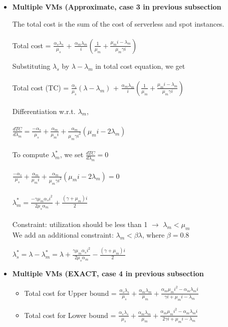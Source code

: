 \documentclass[letter,11pt]{article}
\begin{document}
\begin{itemize}
\item \textbf{Multiple VMs (Approximate, case 3 in previous subsection}

The total cost is the sum of the cost of serverless and spot instances. \\ \\
Total cost = $\frac{\alpha_s \lambda_s}{\mu_s}$ + $\frac{\alpha_m \lambda_m}{i} (\frac{1}{\mu_m} + \frac{\mu_m i - \lambda_m}{\mu_m \gamma i})$

Substituting $\lambda_s$ by $\lambda - \lambda_m$ in total cost equation, we get\\ \\
Total cost (TC) = $\frac{\alpha_s}{\mu_s}(\lambda - \lambda_m)$ + $\frac{\alpha_m \lambda_m}{i} (\frac{1}{\mu_m} + \frac{\mu_m i - \lambda_m}{\mu_m \gamma i})$ \\ \\
Differentiation w.r.t. $\lambda_m$, \\ \\
$\frac{d TC}{d \lambda_m} = \frac{- \alpha_s}{\mu_s} + \frac{\alpha_m}{\mu_m i} + \frac{\alpha_m}{\mu_m \gamma i^2}(\mu_m i - 2 \lambda_m)$ \\ \\
To compute $\lambda_m^{*}$, we set $\frac{d TC}{d \lambda_m} = 0$ \\ \\
$\frac{- \alpha_s}{\mu_s} + \frac{\alpha_m}{\mu_m i} + \frac{\alpha_m}{\mu_m \gamma i^2}(\mu_m i - 2 \lambda_m) = 0$ \\ \\ 
$\lambda_m^{*} = \frac{- \gamma \mu_m \alpha_s i^2}{2 \mu_s \alpha_m} + \frac{(\gamma + \mu_m)i}{2}$ \\ \\
Constraint: utilization should be less than 1 $\rightarrow$ $\lambda_m < \mu_m$\\  
We add an additional constraint: $\lambda_m < \beta \lambda$, where $\beta = 0.8$

$\lambda_s^{*} = \lambda - \lambda_m^{*} = \lambda + \frac{\gamma \mu_m \alpha_s i^2}{2 \mu_s \alpha_m} - \frac{(\gamma + \mu_m)i}{2}$

\item \textbf{Multiple VMs (EXACT, case 4 in previous subsection}

\begin{itemize}
\item Total cost for Upper bound = $\frac{\alpha_s \lambda_s}{\mu_s} + \frac{\alpha_m \lambda_m}{\mu_m} + \frac{\alpha_m \mu_m i^2 - \alpha_m \lambda_m i}{\gamma i + \mu_m i - \lambda_m}$
\item Total cost for Lower bound = $\frac{\alpha_s \lambda_s}{\mu_s} + \frac{\alpha_m \lambda_m}{\mu_m} + \frac{\alpha_m \mu_m i^2 - \alpha_m \lambda_m i}{2 \gamma i + \mu_m i - \lambda_m}$
\end{itemize}

\end{itemize}
\end{document}
